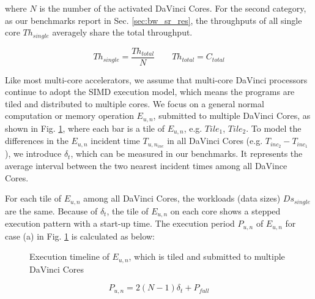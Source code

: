 where $N$ is the number of the activated DaVinci Cores. For the second category, as our benchmarks report in Sec. \ref{sec:bw_sr_res}, the throughputs of all single core $Th_{single}$ averagely share the total throughput.

\begin{equation}
\label{eq:second}
Th_{single} = \frac{Th_{total}}{N} \qquad Th_{total} = C_{total} 
\end{equation}

Like most multi-core accelerators, we assume that multi-core DaVinci processors continue to adopt the SIMD execution model, which means the programs are tiled and distributed to multiple cores. We focus on a general normal computation or memory operation $E_{u, n}$, submitted to multiple DaVinci Cores, as shown in Fig. \ref{fig:multi-core}, where each bar is a tile of $E_{u, n}$, e.g. $Tile_{1}$, $Tile_{2}$. To model the differences in the $E_{u, n}$ incident time $T_{u, n_{inc}}$ in all DaVinci Cores (e.g. $T_{inc_{2}} - T_{inc_{1}}$), we introduce $\delta_{t}$, which can be measured in our benchmarks. It represents the average interval between the two nearest incident times among all DaVince Cores.

For each tile of $E_{u, n}$ among all DaVinci Cores, the workloads (data sizes) $Ds_{single}$ are the same. Because of $\delta_{t}$, the tile of $E_{u, n}$ on each core shows a stepped execution pattern with a start-up time. The execution period $P_{u, n}$ of $E_{u, n}$ for case (a) in Fig. \ref{fig:multi-core} is calculated as below:

\begin{figure}[tbp]
    \caption{
    Execution timeline of $E_{u, n}$, which is tiled and submitted to multiple DaVinci Cores}
    \label{fig:multi-core}
    \end{figure}    

\begin{equation}
P_{u, n} = 2 (N - 1) \delta_{t} + P_{full}
\end{equation}

